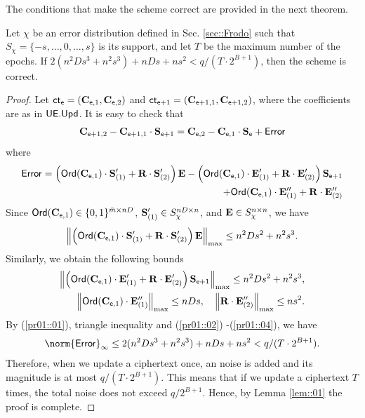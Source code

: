 \documentclass{fundam}
\begin{document}
The conditions that make the scheme correct are provided in the next theorem. 
\begin{theorem}
	Let $\chi$ be an error distribution defined in Sec. \ref{sec::Frodo} such that $S_{\chi}=\{ -s, \ldots, 0,  \ldots ,s \}$ is its support, and
	let $T$ be the maximum number of the epochs. If $2(n^{2}Ds^{3}+n^{2}s^{3})+nDs + ns^{2}<q/(T\cdot 2^{B+1})$, then the scheme is correct.
\end{theorem}	


\begin{proof}
Let $\mathsf{ct}_{\mathsf{e}} =  (\mathbf{C}_{\mathsf{e},1}, \mathbf{C}_{\mathsf{e}, 2})$ and $\mathsf{ct}_{\mathsf{e}+1} =  (\mathbf{C}_{\mathsf{e}+1,1}, \mathbf{C}_{\mathsf{e}+1, 2})$, where the coefficients are as in $\mathsf{UE.Upd}$. It is easy to check that 
 \begin{align*}
	\mathbf{C}_{\mathsf{e}+1,2} - \mathbf{C}_{\mathsf{e} +1, 1}\cdot \mathbf{S}_{\mathsf{e} +1} = \mathbf{C}_{\mathsf{e},2} - \mathbf{C}_{\mathsf{e} , 1}\cdot \mathbf{S}_{\mathsf{e} } + \mathsf{Error}
\end{align*}
where
\begin{align}\label{pr01::01}
	\mathsf{Error}= \left(\mathsf{Ord}(\mathbf{C}_{\mathsf{e} , 1})\cdot\mathbf{S}_{(1)}' + \mathbf{R}\cdot \mathbf{S}_{(2)}'\right)\mathbf{E}- \left(\mathsf{Ord}(\mathbf{C}_{\mathsf{e} , 1})\cdot\mathbf{E}_{(1)}' + \mathbf{R}\cdot \mathbf{E}_{(2)}'\right)\mathbf{S}_{\mathsf{e}+1} \\
	+ \mathsf{Ord}(\mathbf{C}_{\mathsf{e} , 1})\cdot\mathbf{E}_{(1)}'' + \mathbf{R}\cdot \mathbf{E}_{(2)}'' \nonumber
\end{align}
Since $\mathsf{Ord}(\mathbf{C}_{\mathsf{e} , 1})\in\{0,1\}^{\bar{m}\times nD}$, $\mathbf{S}_{(1)}' \in S_{\chi}^{nD\times n}$, and $\mathbf{E} \in S_{\chi}^{n\times n}$, we have
\begin{align}\label{pr01::02}
	\left\|  \left(\mathsf{Ord}(\mathbf{C}_{\mathsf{e} , 1})\cdot\mathbf{S}_{(1)}' + \mathbf{R}\cdot \mathbf{S}_{(2)}'\right)\mathbf{E} \right\|_{\max}\leq n^{2}Ds^{2}+n^{2}s^{3}.
\end{align}
Similarly, we obtain the following bounds
\begin{align}
	\left\|  \left(\mathsf{Ord}(\mathbf{C}_{\mathsf{e} , 1})\cdot\mathbf{E}_{(1)}' + \mathbf{R}\cdot \mathbf{E}_{(2)}'\right)\mathbf{S}_{\mathsf{e}+1}    \right\|_{\max}\leq n^{2}Ds^{2}+n^{2}s^{3}, \label{pr01::03}\\
		\left\|  \mathsf{Ord}(\mathbf{C}_{\mathsf{e} , 1})\cdot\mathbf{E}_{(1)}'' \right\|_{\max}\leq nDs, ~~~ \left\|  \mathbf{R}\cdot \mathbf{E}_{(2)}'' \right\|_{\max}\leq ns^{2}. \label{pr01::04}
\end{align}
By (\ref{pr01::01}), triangle inequality and (\ref{pr01::02}) -(\ref{pr01::04}), we have
\begin{align*}
	\norm{\tx{Error}}_{\infty}\leq 2(n^{2}Ds^{3}+n^{2}s^{3})+nDs + ns^{2}<q/(T\cdot 2^{B+1}).
\end{align*}
Therefore, when we update a ciphertext once, an noise is added and its magnitude is at most $q/(T\cdot 2^{B+1})$. This means that if we update a ciphertext $T$ times, the total noise does not exceed $q/2^{B+1}$. Hence, by Lemma \ref{lem::01} the proof is complete.
\end{proof}	
\end{document}
